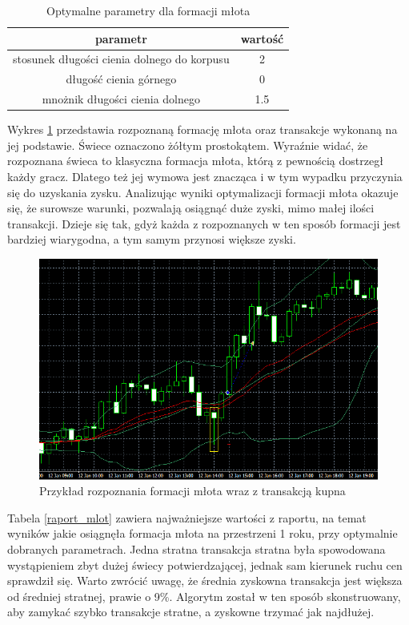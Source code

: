 \documentclass[pdflatex,11pt]{aghdpl}
\begin{document}
\begin{table}[h!]
\begin{center}
\begin{tabular}{|c|c|}
\hline 
parametr & wartość \\
\hline
stosunek długości cienia dolnego do korpusu & 2\\
\hline
długość cienia górnego & 0\\
\hline
mnożnik długości cienia dolnego & 1.5\\
\hline
\end{tabular} 
\caption{Optymalne parametry dla formacji młota}
\label{parametry_mlot}
\end{center}
\end{table}
Wykres \ref{przyklad_mlot} przedstawia rozpoznaną formację młota oraz transakcje wykonaną na jej podstawie. Świece oznaczono żółtym prostokątem. Wyraźnie widać, że rozpoznana świeca to klasyczna formacja młota, którą z pewnością dostrzegł każdy gracz. Dlatego też jej wymowa jest znacząca i w tym wypadku przyczynia się do uzyskania zysku. Analizując wyniki optymalizacji formacji młota okazuje się, że surowsze warunki, pozwalają osiągnąć duże zyski, mimo małej ilości transakcji. Dzieje się tak, gdyż każda z rozpoznanych w ten sposób formacji jest bardziej wiarygodna, a tym samym przynosi większe zyski. 
\begin{figure}[h!]
\begin{center}
\includegraphics[width=14cm]{hammer/przyklad.png}
\caption{Przykład rozpoznania formacji młota wraz z transakcją kupna}
\label{przyklad_mlot}
\end{center}
\end{figure} 
Tabela \ref{raport_mlot} zawiera najważniejsze wartości z raportu, na temat wyników jakie osiągnęła formacja młota na przestrzeni 1 roku, przy optymalnie dobranych parametrach. Jedna stratna transakcja stratna była spowodowana wystąpieniem zbyt dużej świecy potwierdzającej, jednak sam kierunek ruchu cen sprawdził się. Warto zwrócić uwagę, że średnia zyskowna transakcja jest większa od średniej stratnej, prawie o 9\%. Algorytm został w ten sposób skonstruowany, aby zamykać szybko transakcje stratne, a zyskowne trzymać jak najdłużej.
\end{document}
